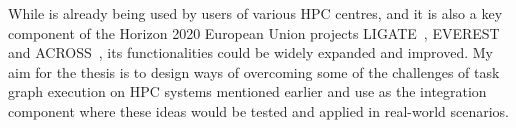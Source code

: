 While \hyperqueue{} is already being used by users of various HPC centres, and it is also a key
component of the Horizon 2020 European Union projects
LIGATE~,
EVEREST~ and
ACROSS~, its functionalities could be widely expanded
and improved. My aim for the thesis is to design ways of overcoming some of the challenges of
task graph execution on HPC systems mentioned earlier and use \hyperqueue{} as the integration
component where these ideas would be tested and applied in real-world scenarios.

%

